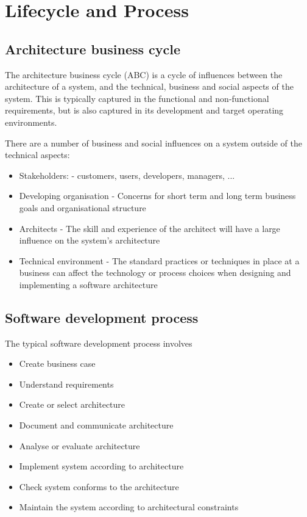 \documentclass{sty/SizheArticle}
\begin{document}
\section{Lifecycle and Process}
\subsection{Architecture business cycle}
The architecture business cycle (ABC) is a cycle of influences between the
architecture of a system, and the technical, business and social aspects
of the system. This is typically captured in the functional and
non-functional requirements, but is also captured in its development
and target operating environments.

There are a number of business and social influences on a system outside
of the technical aspects:
\begin{itemize}
\item Stakeholders: - customers, users, developers, managers, ...
\item Developing organisation - Concerns for short term and long term
  business goals and organisational structure
\item Architects - The skill and experience of the architect will
  have a large influence on the system's architecture
\item Technical environment - The standard practices or techniques in
  place at a business can affect the technology or process choices
  when designing and implementing a software architecture
\end{itemize}

\subsection{Software development process}
The typical software development process involves
\begin{itemize}
\item Create business case
\item Understand requirements
\item Create or select architecture
\item Document and communicate architecture
\item Analyse or evaluate architecture
\item Implement system according to architecture
\item Check system conforms to the architecture
\item Maintain the system according to architectural constraints
\end{itemize}
\end{document}
